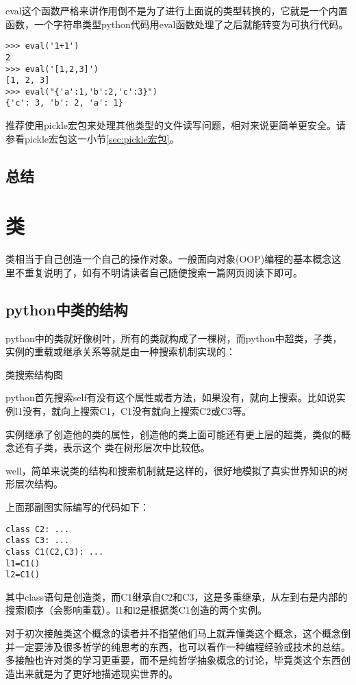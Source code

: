 \documentclass[12pt,oneside]{book}
\begin{document}
\begin{common-format}
eval这个函数严格来讲作用倒不是为了进行上面说的类型转换的，它就是一个内置函数，一个字符串类型python代码用eval函数处理了之后就能转变为可执行代码。
\begin{Verbatim}
>>> eval('1+1')
2
>>> eval('[1,2,3]')
[1, 2, 3]
>>> eval("{'a':1,'b':2,'c':3}")
{'c': 3, 'b': 2, 'a': 1}
\end{Verbatim}

推荐使用pickle宏包来处理其他类型的文件读写问题，相对来说更简单更安全。请参看pickle宏包这一小节\ref{sec:pickle宏包}。





\section{总结}


\chapter{类}
类相当于自己创造一个自己的操作对象。一般面向对象(OOP)编程的基本概念这里不重复说明了，如有不明请读者自己随便搜索一篇网页阅读下即可。

\section{python中类的结构}
python中的类就好像树叶，所有的类就构成了一棵树，而python中超类，子类，实例的重载或继承关系等就是由一种搜索机制实现的：
\begin{fig}{类搜索结构图}
\label{fig:类搜索结构图}
\end{fig}
python首先搜索self有没有这个属性或者方法，如果没有，就向上搜索。比如说实例l1没有，就向上搜索C1，C1没有就向上搜索C2或C3等。

实例继承了创造他的类的属性，创造他的类上面可能还有更上层的超类，类似的概念还有子类，表示这个 类在树形层次中比较低。

well，简单来说类的结构和搜索机制就是这样的，很好地模拟了真实世界知识的树形层次结构。

上面那副图实际编写的代码如下：
\begin{Verbatim}
class C2: ...
class C3: ...
class C1(C2,C3): ...
l1=C1()
l2=C1()
\end{Verbatim}
其中class语句是创造类，而C1继承自C2和C3，这是多重继承，从左到右是内部的搜索顺序（会影响重载）。l1和l2是根据类C1创造的两个实例。

对于初次接触类这个概念的读者并不指望他们马上就弄懂类这个概念，这个概念倒并一定要涉及很多哲学的纯思考的东西，也可以看作一种编程经验或技术的总结。多接触也许对类的学习更重要，而不是纯哲学抽象概念的讨论，毕竟类这个东西创造出来就是为了更好地描述现实世界的。


\end{common-format}
\end{document}
